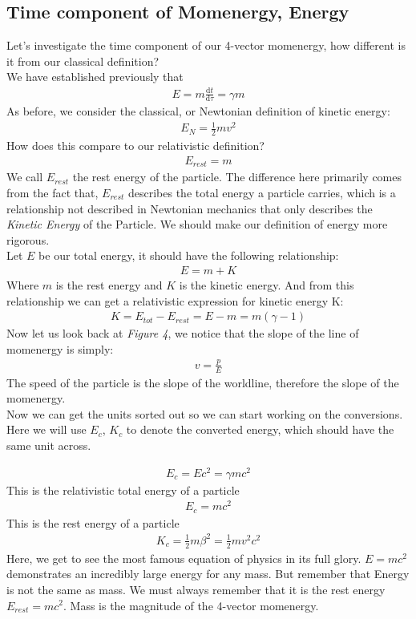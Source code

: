 \documentclass[11pt,letterpaper]{book}
\newcommand{\dydx}[2]{\frac{\text{d} #1}{\text{d} #2}}
\begin{document}
\subsection{Time component of Momenergy, Energy}
Let's investigate the time component of our 4-vector momenergy, how different is it from our classical definition?\\
 
We have established previously that 
\begin{align}
E =m \dydx{t}{\tau} =\gamma m
\end{align}
As before, we consider the classical, or Newtonian definition of kinetic energy:
\begin{align}
E_{N} = \frac{1}{2}mv^2
\end{align}
How does this compare to our relativistic definition?
\begin{align}
E_{rest} = m
\end{align}
We call $E_{rest}$ the rest energy of the particle. The difference here primarily comes from the fact that, $E_{rest}$ describes the total energy a particle carries, which is a relationship not described in Newtonian mechanics that only describes the \textit{Kinetic Energy} of the Particle. We should make our definition of energy more rigorous. \\

Let $E$ be our total energy, it should have the following relationship:
\begin{align}
E = m + K
\end{align}
Where $m$ is the rest energy and $K$ is the kinetic energy. And from this relationship we can get a relativistic expression for kinetic energy K:
\begin{align}
K = E_{tot} - E_{rest} = E - m = m(\gamma - 1)
\end{align}
Now let us look back at \textit{Figure 4}, we notice that the slope of the line of momenergy is simply:
\begin{align}
v = \frac{p}{E}
\end{align}
The speed of the particle is the slope of the worldline, therefore the slope of the momenergy. \\

Now we can get the units sorted out so we can start working on the conversions. Here we will use $E_c$, $K_c$ to denote the converted energy, which should have the same unit across.

\begin{align}
E_c = Ec^2 = \gamma mc^2
\end{align}
This is the relativistic total energy of a particle 
\begin{align}
E_c = mc^2
\end{align}
This is the rest energy of a particle
\begin{align}
K_c = \frac{1}{2}m\beta^2= \frac{1}{2}mv^2c^2 
\end{align}
Here, we get to see the most famous equation of physics in its full glory. $E = mc^2$ demonstrates an incredibly large energy for any mass. But remember that Energy is not the same as mass. We must always remember that it is the rest energy $E_{rest} = mc^2$. Mass is the magnitude of the 4-vector momenergy. 
\end{document}
